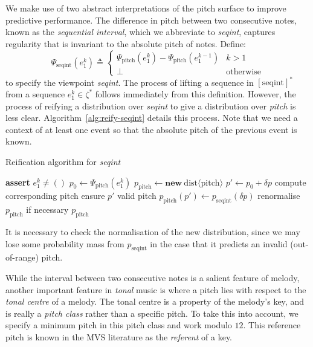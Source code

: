 \documentclass[12pt,a4paper,twoside,openright]{report}
\begin{document}
We make use of two abstract interpretations of the pitch surface to improve
predictive performance. The difference in pitch between two consecutive notes,
known as the \emph{sequential interval}, which we abbreviate to \emph{seqint},
captures regularity that is invariant to the absolute pitch of notes. Define:
$$ \Psi_{\mathrm{seqint}}(e_1^k) \triangleq \begin{cases}
  \Psi_{\mathrm{pitch}}(e_1^k) - \Psi_{\mathrm{pitch}}(e_1^{k-1}) & k > 1 \\
  \bot & \text{otherwise} 
\end{cases}
$$
to specify the viewpoint \emph{seqint}. The process of lifting a sequence in
$[\mathrm{seqint}]^*$ from a sequence $e_1^k \in \zeta^*$ follows immediately
from this definition. However, the process of reifying a distribution over
\emph{seqint} to give a distribution over \emph{pitch} is less clear.
Algorithm~\ref{alg:reify-seqint} details this process. Note that we need a
context of at least one event so that the absolute pitch of the previous event
is known.

\begin{algorithm}[H]
  \caption{Reification algorithm for \emph{seqint}}
  \label{alg:reify-seqint}
  \begin{algorithmic}[1]
      \State \textbf{assert} $e_1^k \neq ()$
      \State $p_0 \gets \Psi_{\mathrm{pitch}}(e_1^k)$
      \State $p_{\mathrm{pitch}} \gets \textbf{new}\
      \mathrm{dist}\langle\mathrm{pitch}\rangle$
        \State $p' \gets p_0 + \delta p$
        \Comment compute corresponding pitch
          \Comment ensure $p'$ valid pitch
          \State $p_{\mathrm{pitch}}(p') \gets p_{\mathrm{seqint}}(\delta p)$
        \EndIf
      \EndFor
      \State renormalise $p_{\mathrm{pitch}}$ if necessary
      \State \Return $p_{\mathrm{pitch}}$
    \EndFunction
  \end{algorithmic}
\end{algorithm}

It is necessary to check the normalisation of the new distribution, since we may
lose some probability mass from $p_{\mathrm{seqint}}$ in the case that it
predicts an invalid (out-of-range) pitch.

While the interval between two consecutive notes is a salient feature of melody,
another important feature in \emph{tonal} music is where a pitch lies with
respect to the \emph{tonal centre} of a melody. The tonal centre is a property
of the melody's key, and is really a \emph{pitch class} rather than a specific
pitch. To take this into account, we specify a minimum pitch in this pitch class
and work modulo $12$. This reference pitch is known in the MVS literature as the
\emph{referent} of a key.
\end{document}

